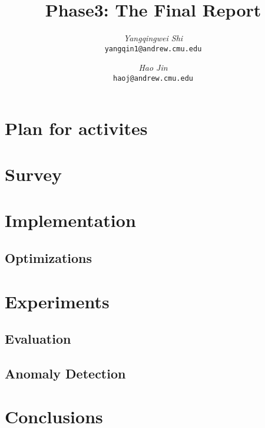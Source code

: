 \documentclass[12pt]{article}
\begin{document}
\newcommand{\beq}{\begin{equation}}
\newcommand{\eeq}{\end{equation}}
\newcommand{\bit}{\begin{itemize*}}
\newcommand{\eit}{\end{itemize*}}
\newcommand{\goal}[1]{ {\noindent {$\Rightarrow$} \em {#1} } }
\newcommand{\hide}[1]{}
\newcommand{\comment}[1]{ {\footnotesize {#1} } }
\newtheorem{lemma}{Lemma}
\newtheorem{theorem}{Theorem}
\newtheorem{proof}{Proof}
\newtheorem{defn}{Definition}
\newtheorem{algo}{Algorithm}
\newtheorem{observation}{Observation}

\title{Phase3: The Final Report}


\author{ {\em Yangqingwei Shi} \\	   
	    {\tt yangqin1@andrew.cmu.edu}
	 \and
	 {\em Hao Jin} \\
	     {\tt haoj@andrew.cmu.edu}}
\maketitle

\section{Plan for activites}
    \label{sec:intro}
    
\newpage
\section{Survey}
    \label{sec:survey}
    
	   
\newpage
\section{Implementation}
\subsection{Optimizations}
	\label{sec:imp}
	
	
\newpage
\section{Experiments}
\subsection{Evaluation}
	\label{sec:expeval}
	
	
\subsection{Anomaly Detection}
	\label{sec:expanal}
	

\newpage
\section{Conclusions}
	\label{sec:concl}
	







\newpage
{}
\end{document}

